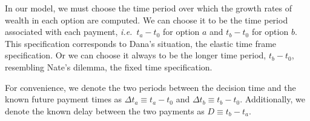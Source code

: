 \documentclass[11pt]{article}
\newcommand{\ie}{{\it i.e.}\ }
\newcommand{\Dt}{\Delta t}
\numberwithin{equation}{section}
\begin{document}
In our model, we must choose the time period over which the growth rates of wealth in each option are computed. We can choose it to be the time period associated with each payment, \ie $t_a-t_0$ for option $a$ and $t_b-t_0$ for option $b$. This specification corresponds to Dana's situation, the elastic time frame specification. Or we can choose it always to be the longer time period, $t_b-t_0$, resembling Nate's dilemma, the fixed time specification.

For convenience, we denote the two periods between the decision time and the known future payment times as $\Dt_a \equiv t_a-t_0$ and $\Dt_b \equiv t_b-t_0$. Additionally, we denote the known delay between the two payments as $D \equiv t_b-t_a$.







\end{document}
